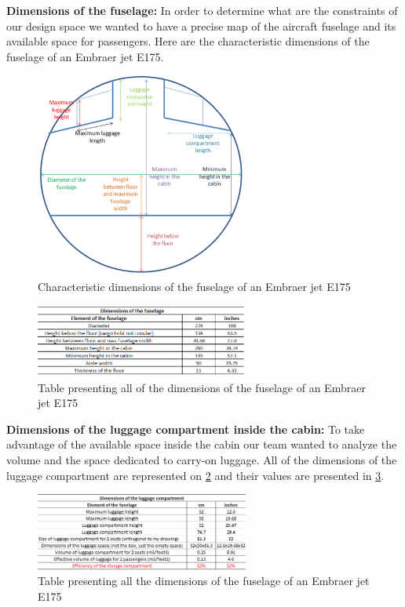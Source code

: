 \textbf{Dimensions of the fuselage:}
In order to determine what are the constraints of our design space we wanted to have a precise map of the aircraft fuselage and its available space for passengers. Here are the characteristic dimensions of the fuselage of an Embraer jet E175.
\begin{figure}[h]
\centering
\includegraphics[width=7cm]{images/fuselage_dimensions}
\caption{Characteristic dimensions of the fuselage of an Embraer jet E175}
\label{fig: fuselage_dimensions}
\end{figure}

\begin{figure}[h]
\centering
\includegraphics[width=7cm]{images/fuselage_table}
\caption{Table presenting all of the dimensions of the fuselage of an Embraer jet E175}
\label{fig:fuselage_table}
\end{figure}

\textbf{Dimensions of the luggage compartment inside the cabin:}
To take advantage of the available space inside the cabin our team wanted to analyze the volume and the space dedicated to carry-on luggage. All of the dimensions of the luggage compartment are represented on \ref{fig:fuselage_table} and their values are presented in \ref{fig:luggage_compartment_table}.
\begin{figure}[h]
\centering
\includegraphics[width=7cm]{images/luggage_compartment_table.png}
\caption{Table presenting all the dimensions of the fuselage of an Embraer jet E175}
\label{fig:luggage_compartment_table}
\end{figure}

